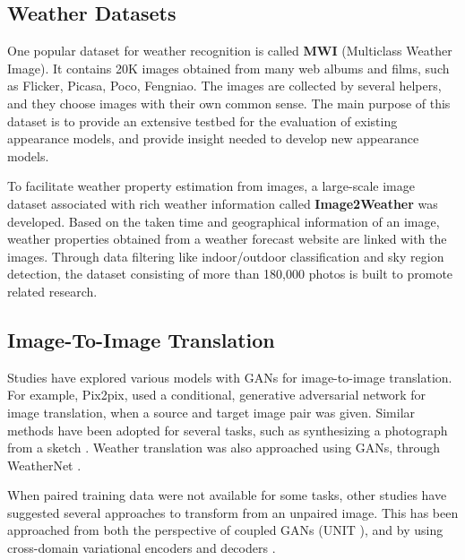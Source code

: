 \documentclass[11pt]{article}
\begin{document}
    \subsection{Weather Datasets}

    One popular dataset for weather recognition is called \textbf{MWI} \cite{7351637, ZHANG2016365}
    (Multiclass Weather Image). It contains 20K images obtained from many web albums and 
    films, such as Flicker, Picasa, Poco, Fengniao. The images are collected 
    by several helpers, and they choose images with their own common sense. The main 
    purpose of this dataset is to provide an extensive testbed for the evaluation of 
    existing appearance models, and provide insight needed to develop new appearance models.

    To facilitate weather property estimation from images, a large-scale image dataset 
    associated with rich weather information called \textbf{Image2Weather} \cite{7545010} 
    was developed. Based on the taken time and geographical information of an image, 
    weather properties obtained from a weather forecast website are linked with the images. 
    Through data filtering like indoor/outdoor classification and sky region detection, 
    the dataset consisting of more than 180,000 photos is built to promote related research.
    
    \subsection{Image-To-Image Translation}

    Studies have explored various models with GANs for image-to-image translation.
    For example, Pix2pix, used a conditional, generative adversarial network 
    \cite{DBLP:journals/corr/MirzaO14} for image translation, when a source and target image 
    pair was given. Similar methods have been adopted for several tasks, such as synthesizing 
    a photograph from a sketch \cite{DBLP:journals/corr/SangkloyLFYH16}. Weather translation
    was also approached using GANs, through WeatherNet \cite{DBLP:journals/corr/abs-1910-09910}.

    When paired training data were not available for some tasks, other studies have 
    suggested several approaches to transform from an unpaired image. This has been approached
    from both the perspective of coupled GANs (UNIT \cite{DBLP:journals/corr/LiuBK17}),
    and by using cross-domain variational encoders and decoders \cite{DBLP:10.3390/app9224780}.
\end{document}
